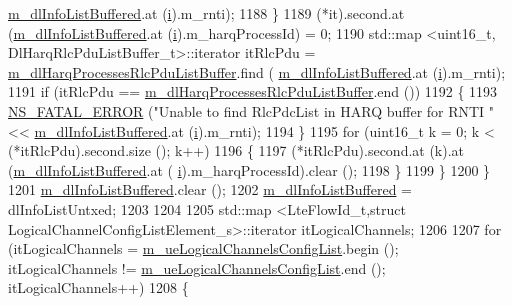 \begin{DoxyCode}
      \hyperlink{classns3_1_1CqaFfMacScheduler_aabc929a8c1c30338a5fa0826bb7cd2b8}{m\_dlInfoListBuffered}.at (\hyperlink{bernuolliDistribution_8m_a6f6ccfcf58b31cb6412107d9d5281426}{i}).m\_rnti);
1188             \}
1189           (*it).second.at (\hyperlink{classns3_1_1CqaFfMacScheduler_aabc929a8c1c30338a5fa0826bb7cd2b8}{m\_dlInfoListBuffered}.at (\hyperlink{bernuolliDistribution_8m_a6f6ccfcf58b31cb6412107d9d5281426}{i}).m\_harqProcessId) = 0;
1190           std::map <uint16\_t, DlHarqRlcPduListBuffer\_t>::iterator itRlcPdu =  
      \hyperlink{classns3_1_1CqaFfMacScheduler_a019cbb20e91d699a8c7e26fb8d69ff4e}{m\_dlHarqProcessesRlcPduListBuffer}.find (
      \hyperlink{classns3_1_1CqaFfMacScheduler_aabc929a8c1c30338a5fa0826bb7cd2b8}{m\_dlInfoListBuffered}.at (\hyperlink{bernuolliDistribution_8m_a6f6ccfcf58b31cb6412107d9d5281426}{i}).m\_rnti);
1191           \textcolor{keywordflow}{if} (itRlcPdu == \hyperlink{classns3_1_1CqaFfMacScheduler_a019cbb20e91d699a8c7e26fb8d69ff4e}{m\_dlHarqProcessesRlcPduListBuffer}.end ())
1192             \{
1193               \hyperlink{group__fatal_ga5131d5e3f75d7d4cbfd706ac456fdc85}{NS\_FATAL\_ERROR} (\textcolor{stringliteral}{"Unable to find RlcPdcList in HARQ buffer for RNTI "} << 
      \hyperlink{classns3_1_1CqaFfMacScheduler_aabc929a8c1c30338a5fa0826bb7cd2b8}{m\_dlInfoListBuffered}.at (\hyperlink{bernuolliDistribution_8m_a6f6ccfcf58b31cb6412107d9d5281426}{i}).m\_rnti);
1194             \}
1195           \textcolor{keywordflow}{for} (uint16\_t k = 0; k < (*itRlcPdu).second.size (); k++)
1196             \{
1197               (*itRlcPdu).second.at (k).at (\hyperlink{classns3_1_1CqaFfMacScheduler_aabc929a8c1c30338a5fa0826bb7cd2b8}{m\_dlInfoListBuffered}.at (
      \hyperlink{bernuolliDistribution_8m_a6f6ccfcf58b31cb6412107d9d5281426}{i}).m\_harqProcessId).clear ();
1198             \}
1199         \}
1200     \}
1201   \hyperlink{classns3_1_1CqaFfMacScheduler_aabc929a8c1c30338a5fa0826bb7cd2b8}{m\_dlInfoListBuffered}.clear ();
1202   \hyperlink{classns3_1_1CqaFfMacScheduler_aabc929a8c1c30338a5fa0826bb7cd2b8}{m\_dlInfoListBuffered} = dlInfoListUntxed;
1203         
1204         
1205   std::map <LteFlowId\_t,struct LogicalChannelConfigListElement\_s>::iterator itLogicalChannels;
1206         
1207   \textcolor{keywordflow}{for} (itLogicalChannels = \hyperlink{classns3_1_1CqaFfMacScheduler_a2e7fafcc959bf531979bc041782ac5b1}{m\_ueLogicalChannelsConfigList}.begin (); 
      itLogicalChannels != \hyperlink{classns3_1_1CqaFfMacScheduler_a2e7fafcc959bf531979bc041782ac5b1}{m\_ueLogicalChannelsConfigList}.end (); itLogicalChannels++)
1208     \{

\end{DoxyCode}
